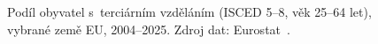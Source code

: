 \def\strVyhledVzdelaniVyvojTitle{Podíl obyvatel s terciárním vzděláním (25--64 let)}%
\def\strVyhledVzdelaniVyvojYlabel{podíl s ISCED 5--8 [\%]}%
\def\strVyhledVzdelaniVyvojCaption{Podíl obyvatel s~terciárním vzděláním (ISCED 5--8, věk 25--64 let), vybrané země \acs{EU}, 2004--2025. Zdroj dat: Eurostat~\cite{eurostat_edat_lfse_03_ED58}.}%
%
\begin{figure}[htbp]
  \centering
  \resizebox{\linewidth}{!}{}
  \caption{\strVyhledVzdelaniVyvojCaption}
  \label{fig:vyhled_vzdelani_vyvoj}
\end{figure}
